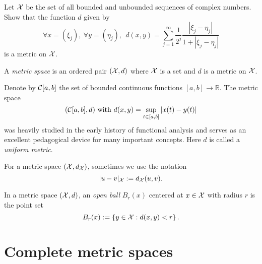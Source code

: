 \begin{exc}
  Let ${\cal X}$ be the set of all bounded and unbounded sequences
  of complex numbers. Show that the function $d$ given by
  \begin{equation}
    \label{eq:complexSequenceMetric}
    \forall x=(\xi_j),\ \forall y=(\eta_j),\ \ 
    d(x,y) = \sum_{j=1}^{\infty} \frac{1}{2^j}
    \frac{|\xi_j-\eta_j|}{1+|\xi_j-\eta_j|}
  \end{equation}
  is a metric on ${\cal X}$.
\end{exc}

\begin{defn}
  \label{def:metricSpace}
  A \emph{metric space} is an ordered pair $({\cal X}, d)$
  where ${\cal X}$ is a set and $d$ is a metric on ${\cal X}$.
\end{defn}

\begin{exm}
  \label{exm:continuousMapMetricSpace}
  Denote by ${\cal C}[a,b]$
  the set of bounded continuous functions
  $[a,b]\rightarrow \mathbb{R}$.
  The metric space 
  \begin{equation}
    \label{eq:CabMetricSpace}
    ({\cal C}[a,b],d) \text{ with }
    d(x,y)=\sup_{t\in[a,b]}|x(t)-y(t)|
  \end{equation}
  was heavily studied
  in the early history of functional analysis
  and serves as an excellent pedagogical device
  for many important concepts. 
  Here $d$ is called a \emph{uniform metric}.
\end{exm}

\begin{ntn}
  For a metric space $({\cal X},d_{{\cal X}})$,
  sometimes we use the notation
  \begin{equation}
    \label{eq:distanceNotation}
    |u-v|_{{\cal X}} := d_{{\cal X}}(u,v).
  \end{equation}
\end{ntn}

\begin{defn}
  \label{def:openBallMetricSpace}
  In a metric space $({\cal X},d)$,
  an \emph{open ball} $B_r(x)$ centered at $x\in {\cal X}$
  with radius $r$ is the point set
  \begin{equation}
    \label{eq:openBallMetricSpace}
    B_r(x) := \left\{y\in {\cal X}: d(x,y)<r\right\}.
  \end{equation}
\end{defn}

\section{Complete metric spaces}
\label{sec:compl-conv}

